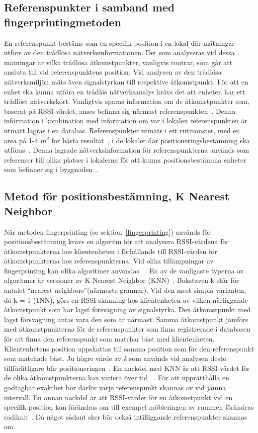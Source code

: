 \documentclass[a4paper,12pt]{article}
\begin{document}
 \subsection{Referenspunkter i samband med fingerprintingmetoden}\label{referenspunkter}
 En referenspunkt bestäms som en specifik position i en lokal där mätningar utförs av den trådlösa nätverksinformationen. Det som analyseras vid dessa mätningar är vilka trådlösa åtkomstpunkter, vanligvis routrar, som går att ansluta till vid referenspunktens position. Vid analysen av den trådlösa nätverksmiljön mäts även signalstyrkan till respektive åtkomstpunkt. För att en enhet ska kunna utföra en trådlös nätverksanalys krävs det att enheten har ett trådlöst nätverkskort. Vanligtvis sparas information om de åtkomstpunkter som, baserat på RSSI-värdet, anses befinna sig närmast referenspunkten~\cite{IP1}. Denna information i kombination med information om var i lokalen referenspunkten är utmätt lagras i en databas. Referenspunkter utmäts i ett rutmönster, med en area på 1-4 $m^2$ för bästa resultat~\cite{yiu2017wireless}, i de lokaler där positioneringsbestämning ska utföras~\cite{IP1}. Denna lagrade nätverksinformation för referenspunkterna används som referenser till olika platser i lokalerna för att kunna positionsbestämma enheter som befinner sig i byggnaden~\cite{yiu2017wireless,IP1}.


 \subsection{Metod för positionsbestämning, K Nearest Neighbor}\label{KNN}
 När metoden fingerprinting (se sektion~\ref{fingerprinting}) används för positionsbestämning krävs en algoritm för att analysera RSSI-värdena för åtkomstpunkterna hos klientenheten i förhållande till RSSI-värden för åtkomstpunkterna hos referenspunkterna. Vid olika tillämpningar av fingerprinting kan olika algoritmer användas ~\cite{tian2013fingerprint,jun2018low}. En av de vanligaste typerna av algoritmer är versioner av K Nearest Neighbor (KNN)~\cite{tian2013fingerprint}.
 Bokstaven k står för antalet ``nearest neighbors''(närmaste grannar). Vid den mest simpla varianten, då k = 1 (1NN), görs en RSSI-skanning hos klientenheten av vilken närliggande åtkomstpunkt som har lägst försvagning av signalstyrka. Den åtkomstpunkt med lägst försvagning antas vara den som är närmast. Samma åtkomstpunkt jämförs med åtkomstpunkterna för de referenspunkter som finns registrerade i databasen för att finna den referenspunkt som matchar bäst med klientenheten. Klientenhetens position uppskattas till samma position som för den referenspunkt som matchade bäst.
 Ju högre värde av \textit{k} som används vid analysen desto tillförlitligare blir positioneringen~\cite{yiu2017wireless}.
 En nackdel med KNN är att RSSI-värdet för de olika åtkomstpunkterna kan variera över tid ~\cite{tian2013fingerprint}. För att upprätthålla en godtagbar exakthet bör därför varje referenspunkt skannas av vid jämna intervall.
 En annan nackdel är att RSSI-värdet för en åtkomstpunkt vid en specifik position kan förändras om till exempel möbleringen av rummen förändras radikalt~\cite{zanca2008experimental}. Då något sådant sker bör också intilliggande referenspunkter skannas om.
\end{document}
